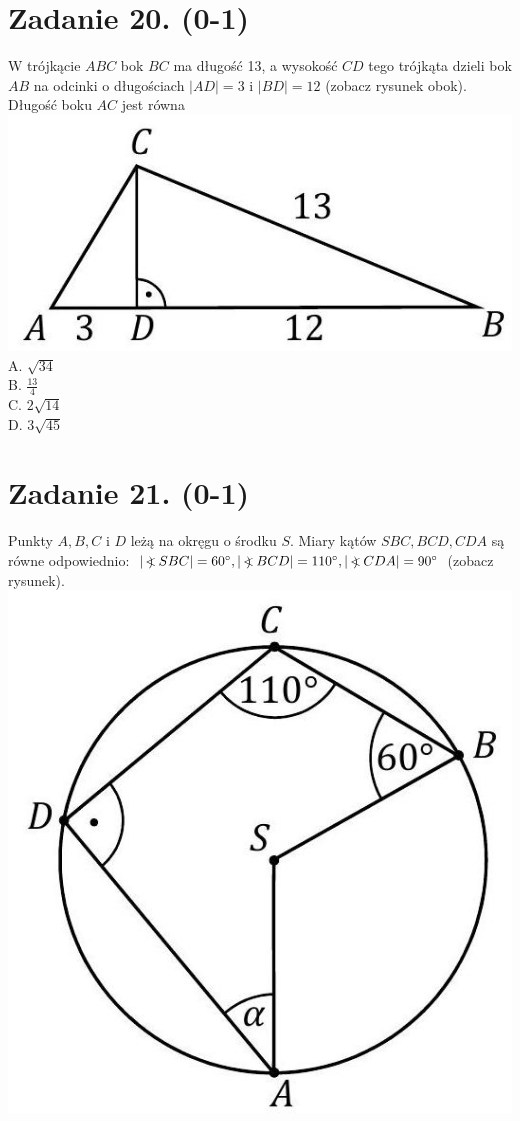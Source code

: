 \documentclass[10pt]{article}
\newcommand\Varangle{\mathop{{<\!\!\!\!\!\text{\small)}}\:}\nolimits}
\begin{document}
\section*{Zadanie 20. (0-1)}
W trójkącie \(A B C\) bok \(B C\) ma długość 13, a wysokość \(C D\) tego trójkąta dzieli bok \(A B\) na odcinki o długościach \(|A D|=3\) i \(|B D|=12\) (zobacz rysunek obok). Długość boku \(A C\) jest równa\\
\includegraphics[max width=\textwidth, center]{2024_11_21_46d945490f1b2eff1c8eg-10}\\
A. \(\sqrt{34}\)\\
B. \(\frac{13}{4}\)\\
C. \(2 \sqrt{14}\)\\
D. \(3 \sqrt{45}\)

\section*{Zadanie 21. (0-1)}
Punkty \(A, B, C\) i \(D\) leżą na okręgu o środku \(S\). Miary kątów \(S B C, B C D, C D A\) są równe odpowiednio: \(|\Varangle S B C|=60^{\circ},|\Varangle B C D|=110^{\circ},|\Varangle C D A|=90^{\circ}\) (zobacz rysunek).\\
\includegraphics[max width=\textwidth, center]{2024_11_21_46d945490f1b2eff1c8eg-10(1)}
\end{document}
